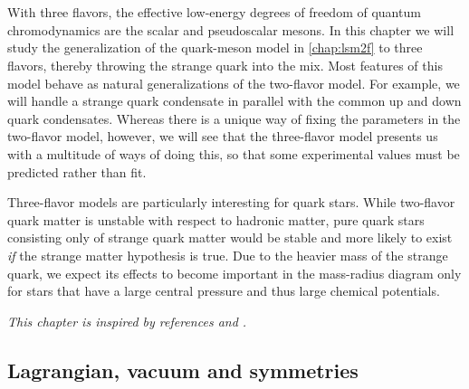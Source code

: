 \chapter{\texorpdfstring{}{The Three-Flavor Quark-Meson Model}}
\label{chap:lsm3f}

With three flavors, the effective low-energy degrees of freedom of quantum chromodynamics are the scalar and pseudoscalar mesons. %
In this chapter we will study the generalization of the quark-meson model in \cref{chap:lsm2f} to three flavors,
thereby throwing the strange quark into the mix.
Most features of this model behave as natural generalizations of the two-flavor model.
For example, we will handle a strange quark condensate in parallel with the common up and down quark condensates.
Whereas there is a unique way of fixing the parameters in the two-flavor model, however,
we will see that the three-flavor model presents us with a multitude of ways of doing this,
so that some experimental values must be predicted rather than fit.

Three-flavor models are particularly interesting for quark stars.
While two-flavor quark matter is unstable with respect to hadronic matter,
pure quark stars consisting only of strange quark matter would be stable and more likely to exist
\emph{if} the strange matter hypothesis is true.
Due to the heavier mass of the strange quark,
we expect its effects to become important in the mass-radius diagram
only for stars that have a large central pressure and thus large chemical potentials.

\textit{This chapter is inspired by references \cite{ref:lsm3f} and \cite{ref:lsm3f_details}.}

\section{Lagrangian, vacuum and symmetries}

